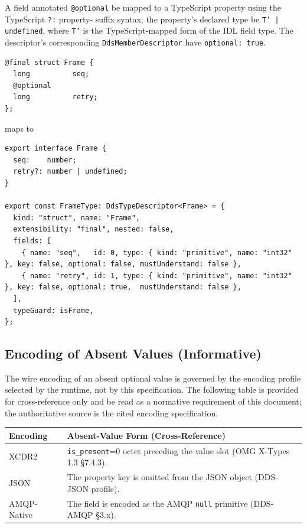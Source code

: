 \documentclass{../styles/zerodds-vendor-spec}
\begin{document}
A field annotated \texttt{@optional}  be mapped to a
TypeScript property using the TypeScript \texttt{?:} property-
suffix syntax; the property's declared type  be
\texttt{T' | undefined}, where \texttt{T'} is the TypeScript-mapped
form of the IDL field type. The descriptor's corresponding
\texttt{DdsMemberDescriptor}  have
\texttt{optional:\,true}.

\begin{specexample}
\begin{lstlisting}
@final struct Frame {
  long          seq;
  @optional
  long          retry;
};
\end{lstlisting}
maps to
\begin{lstlisting}
export interface Frame {
  seq:    number;
  retry?: number | undefined;
}

export const FrameType: DdsTypeDescriptor<Frame> = {
  kind: "struct", name: "Frame",
  extensibility: "final", nested: false,
  fields: [
    { name: "seq",   id: 0, type: { kind: "primitive", name: "int32" }, key: false, optional: false, mustUnderstand: false },
    { name: "retry", id: 1, type: { kind: "primitive", name: "int32" }, key: false, optional: true,  mustUnderstand: false },
  ],
  typeGuard: isFrame,
};
\end{lstlisting}
\end{specexample}

\subsection{Encoding of Absent Values (Informative)}

The wire encoding of an absent optional value is governed by the
encoding profile selected by the runtime, not by this
specification. The following table is provided for cross-reference
only and  be read as a normative requirement of
this document; the authoritative source is the cited encoding
specification.

\begin{longtable}{p{3cm}p{8.5cm}}
  \toprule
  \textbf{Encoding} & \textbf{Absent-Value Form (Cross-Reference)} \\
  \midrule
  \endhead
  XCDR2          & \texttt{is\_present}=0 octet preceding the value
                   slot (OMG X-Types 1.3 §7.4.3). \\
  JSON           & The property key is omitted from the JSON object
                   (DDS-JSON profile). \\
  AMQP-Native    & The field is encoded as the AMQP \texttt{null}
                   primitive (DDS-AMQP §3.x). \\
  \bottomrule
\end{longtable}
\end{document}
